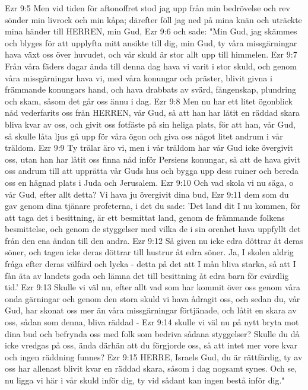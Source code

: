 Ezr 9:5  Men vid tiden för aftonoffret stod jag upp från min bedrövelse och rev sönder min livrock och min kåpa; därefter föll jag ned på mina knän och uträckte mina händer till HERREN, min Gud,
Ezr 9:6  och sade: "Min Gud, jag skämmes och blyges för att upplyfta mitt ansikte till dig, min Gud, ty våra missgärningar hava växt oss över huvudet, och vår skuld är stor allt upp till himmelen.
Ezr 9:7  Från våra fäders dagar ända till denna dag hava vi varit i stor skuld, och genom våra missgärningar hava vi, med våra konungar och präster, blivit givna i främmande konungars hand, och hava drabbats av svärd, fångenskap, plundring och skam, såsom det går oss ännu i dag.
Ezr 9:8  Men nu har ett litet ögonblick nåd vederfarits oss från HERREN, vår Gud, så att han har låtit en räddad skara bliva kvar av oss, och givit oss fotfäste på sin heliga plats, för att han, vår Gud, så skulle låta ljus gå upp för våra ögon och giva oss något litet andrum i vår träldom.
Ezr 9:9  Ty trälar äro vi, men i vår träldom har vår Gud icke övergivit oss, utan han har låtit oss finna nåd inför Persiens konungar, så att de hava givit oss andrum till att upprätta vår Guds hus och bygga upp dess ruiner och bereda oss en hägnad plats i Juda och Jerusalem.
Ezr 9:10  Och vad skola vi nu säga, o vår Gud, efter allt detta? Vi hava ju övergivit dina bud,
Ezr 9:11  dem som du gav genom dina tjänare profeterna, i det du sade: 'Det land dit I nu kommen, för att taga det i besittning, är ett besmittat land, genom de främmande folkens besmittelse, och genom de styggelser med vilka de i sin orenhet hava uppfyllt det från den ena ändan till den andra.
Ezr 9:12  Så given nu icke edra döttrar åt deras söner, och tagen icke deras döttrar till hustrur åt edra söner. Ja, I skolen aldrig fråga efter deras välfärd och lycka - detta på det att I mån bliva starka, så att I fån äta av landets goda och lämna det till besittning åt edra barn för evärdlig tid.'
Ezr 9:13  Skulle vi väl nu, efter allt vad som har kommit över oss genom våra onda gärningar och genom den stora skuld vi hava ådragit oss, och sedan du, vår Gud, har skonat oss mer än våra missgärningar förtjänade, och låtit en skara av oss, sådan som denna, bliva räddad -
Ezr 9:14  skulle vi väl nu på nytt bryta mot dina bud och befrynda oss med folk som bedriva sådana styggelser? Skulle du då icke vredgas på oss, ända därhän att du förgjorde oss, så att intet mer vore kvar och ingen räddning funnes?
Ezr 9:15  HERRE, Israels Gud, du är rättfärdig, ty av oss har allenast blivit kvar en räddad skara, såsom i dag nogsamt synes. Och se, nu ligga vi här i vår skuld inför dig, ty vid sådant kan ingen bestå inför dig."
